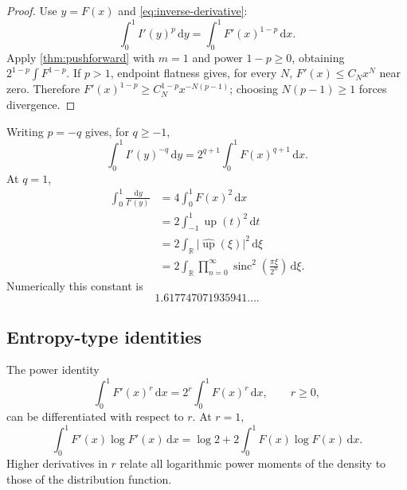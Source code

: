 \documentclass[11pt]{article}
\theoremstyle{definition}
\theoremstyle{remark}
\DeclareMathOperator{\upf}{up}
\DeclareMathOperator{\sinc}{sinc}
\newcommand{\R}{\mathbb R}
\newcommand{\dd}{\,\mathrm d}
\newcommand{\abs}[1]{\lvert#1\rvert}
\begin{document}
\begin{proof}
Use \(y=F(x)\) and \eqref{eq:inverse-derivative}:
\[
 \int_0^1I'(y)^p\dd y
 =\int_0^1F'(x)^{1-p}\dd x.
\]
Apply \cref{thm:pushforward} with \(m=1\) and power \(1-p\ge0\), obtaining
\(2^{1-p}\int F^{1-p}\).  If \(p>1\), endpoint flatness gives, for every \(N\),
\(F'(x)\le C_Nx^N\) near zero.  Therefore
\(F'(x)^{1-p}\ge C_N^{1-p}x^{-N(p-1)}\); choosing \(N(p-1)\ge1\) forces divergence.
\end{proof}

Writing \(p=-q\) gives, for \(q\ge-1\),
\begin{equation}
 \int_0^1I'(y)^{-q}\dd y
 =2^{q+1}\int_0^1F(x)^{q+1}\dd x.                        \label{eq:inverse-reciprocal-moments}
\end{equation}
At \(q=1\),
\begin{align}
 \int_0^1\frac{\dd y}{I'(y)}
 &=4\int_0^1F(x)^2\dd x                                  \label{eq:reciprocal-Iprime-F2}\\
 &=2\int_{-1}^1\upf(t)^2\dd t                            \\
 &=2\int_{\R}\abs{\widehat{\upf}(\xi)}^2\dd\xi        \label{eq:reciprocal-Iprime-fourier}\\
 &=2\int_\R\prod_{n=0}^{\infty}
   \sinc^2\!\left(\frac{\pi\xi}{2^n}\right)\dd\xi.
\end{align}
Numerically this constant is
\begin{equation}
 1.617747071935941\ldots.                                  \label{eq:reciprocal-Iprime-numeric}
\end{equation}

\subsection{Entropy-type identities}

The power identity
\begin{equation}
 \int_0^1F'(x)^r\dd x=2^r\int_0^1F(x)^r\dd x,
 \qquad r\ge0,                                            \label{eq:Fprime-power}
\end{equation}
can be differentiated with respect to \(r\).  At \(r=1\),
\begin{equation}
 \int_0^1F'(x)\log F'(x)\dd x
 =\log2+2\int_0^1F(x)\log F(x)\dd x.                    \label{eq:entropy-identity}
\end{equation}
Higher derivatives in \(r\) relate all logarithmic power moments of the density to those
of the distribution function.
\end{document}
